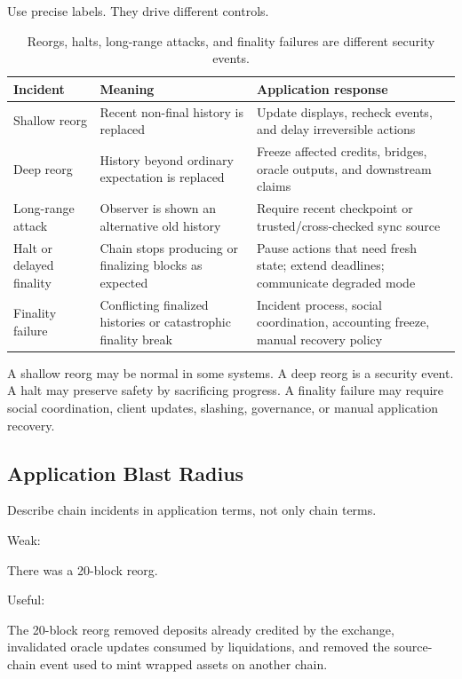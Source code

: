 Use precise labels. They drive different controls.

\begin{table}[htbp]
\centering
\small
\renewcommand{\arraystretch}{1.18}
\begin{tabularx}{\textwidth}{@{}>{\RaggedRight\arraybackslash}p{}>{\RaggedRight\arraybackslash}p{}X@{}}
\toprule
Incident & Meaning & Application response \\
\midrule
Shallow reorg & Recent non-final history is replaced & Update displays, recheck events, and delay irreversible actions \\
Deep reorg & History beyond ordinary expectation is replaced & Freeze affected credits, bridges, oracle outputs, and downstream claims \\
Long-range attack & Observer is shown an alternative old history & Require recent checkpoint or trusted/cross-checked sync source \\
Halt or delayed finality & Chain stops producing or finalizing blocks as expected & Pause actions that need fresh state; extend deadlines; communicate degraded mode \\
Finality failure & Conflicting finalized histories or catastrophic finality break & Incident process, social coordination, accounting freeze, manual recovery policy \\
\bottomrule
\end{tabularx}
\caption{Reorgs, halts, long-range attacks, and finality failures are different security events.}
\end{table}

A shallow reorg may be normal in some systems. A deep reorg is a security event. A halt may preserve safety by sacrificing progress. A finality failure may require social coordination, client updates, slashing, governance, or manual application recovery.

\subsection{Application Blast Radius}

Describe chain incidents in application terms, not only chain terms.

Weak:

\begin{codeblock}
There was a 20-block reorg.
\end{codeblock}

Useful:

\begin{codeblock}
The 20-block reorg removed deposits already credited by the exchange,
invalidated oracle updates consumed by liquidations, and removed the
source-chain event used to mint wrapped assets on another chain.
\end{codeblock}

